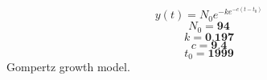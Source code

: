 \documentclass[border=0pt,varwidth,fleqn]{standalone}
\begin{document}
 
\huge
\[
    y(t) = N_0 e^{-k e^{-c (t - t_0)}}
\]
\large
\[
    N_0 = \textbf{94}
\]
\[
    k = \textbf{0.197}
\]
\[
    c = \textbf{9.4}
\]
\[
    t_0 = \textbf{1999}
\]
Gompertz growth model.
\end{document}
